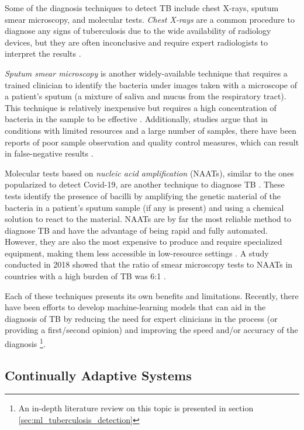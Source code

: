 \documentclass[../main.tex]{subfiles}
\begin{document}
    Some of the diagnosis techniques to detect TB include chest X-rays, sputum smear microscopy, and molecular tests. \textit{Chest X-rays} are a common procedure to diagnose any signs of tuberculosis due to the wide availability of radiology devices, but they are often inconclusive and require expert radiologists to interpret the results \cite{escalante_tuberculosis_2009}.
    
    \textit{Sputum smear microscopy} is another widely-available technique that requires a trained clinician to identify the bacteria under images taken with a microscope of a patient's sputum (a mixture of saliva and mucus from the respiratory tract). This technique is relatively inexpensive but requires a high concentration of bacteria in the sample to be effective \cite{desikan_sputum_2013}. Additionally, studies argue that in conditions with limited resources and a large number of samples, there have been reports of poor sample observation and quality control measures, which can result in false-negative results \cite{desikan_sputum_2013}.
    
    Molecular tests based on \textit{nucleic acid amplification} (NAATs), similar to the ones popularized to detect Covid-19, are another technique to diagnose TB \cite{cdc_tb_2016}. These tests identify the presence of bacilli by amplifying the genetic material of the bacteria in a patient's sputum sample (if any is present) and using a chemical solution to react to the material. NAATs are by far the most reliable method to diagnose TB and have the advantage of being rapid and fully automated. However, they are also the most expensive to produce and require specialized equipment, making them less accessible in low-resource settings \cite{albert_development_2016, maclean_advances_2020}. A study conducted in 2018 showed that the ratio of smear microscopy tests to NAATs in countries with a high burden of TB was 6:1 \cite{cazabon_market_2018, maclean_advances_2020}.

    Each of these techniques presents its own benefits and limitations. Recently, there have been efforts to develop machine-learning models that can aid in the diagnosis of TB by reducing the need for expert clinicians in the process (or providing a first/second opinion) and improving the speed and/or accuracy of the diagnosis \footnote{An in-depth literature review on this topic is presented in section \ref{sec:ml_tuberculosis_detection}}.

    \subsection{Continually Adaptive Systems} \label{sec:continually_adaptive_systems}
\end{document}
